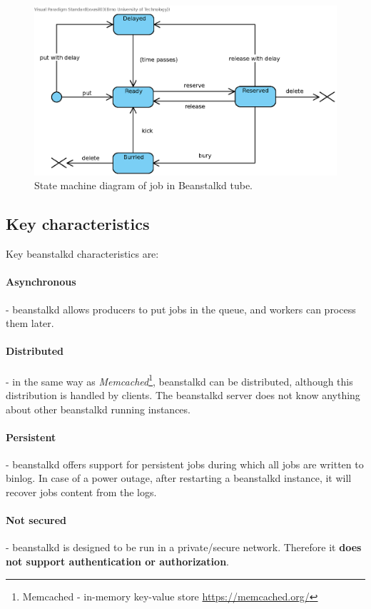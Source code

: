    \begin{figure}[H]
        \centering
        \includegraphics[width=1\textwidth]{obrazky-figures/beanstalkd-job-states.eps}
        \caption{State machine diagram of job in Beanstalkd tube.}
        \label{fig:beanstalkdJobSM}
    \end{figure}


    \subsection{Key characteristics}
    Key beanstalkd characteristics are:

    \paragraph{Asynchronous}- beanstalkd allows producers to put jobs in the queue, and workers can process them later.
    \paragraph{Distributed}- in the same way as \textit{Memcached}\footnote{Memcached - in-memory key-value store {\url{https://memcached.org/}}}, beanstalkd can be distributed, although this distribution is handled by clients. The beanstalkd server does not know anything about other beanstalkd running instances.
    \paragraph{Persistent}- beanstalkd offers support for persistent jobs during which all jobs are written to binlog. In case of a power outage, after restarting a beanstalkd instance, it will recover jobs content from the logs.
    \paragraph{Not secured}- beanstalkd is designed to be run in a private/secure network. Therefore it \textbf{does not support authentication or authorization}.
